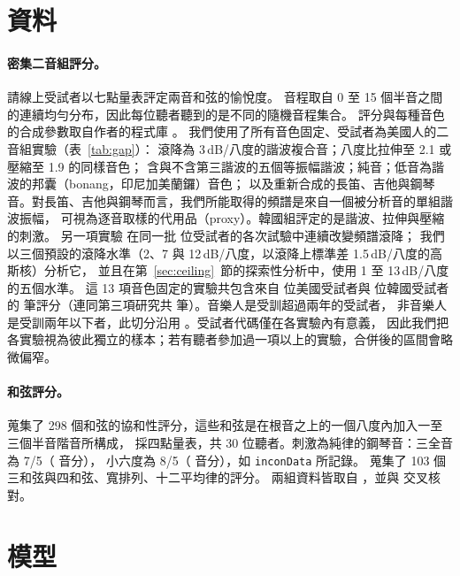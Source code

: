 \documentclass[11pt,a4paper]{article}
\begin{document}
\section{資料}

\paragraph{密集二音組評分。}
\citet{marjieh2024} 請線上受試者以七點量表評定兩音和弦的愉悅度。
音程取自 0 至 15 個半音之間的連續均勻分布，因此每位聽者聽到的是不同的隨機音程集合。
評分與每種音色的合成參數取自作者的程式庫 \citep{marjieh2024code}。
我們使用了所有音色固定、受試者為美國人的二音組實驗（表~\ref{tab:gap}）：
滾降為 3\,dB/八度的諧波複合音；八度比拉伸至 2.1 或壓縮至 1.9 的同樣音色；
含與不含第三諧波的五個等振幅諧波；純音；低音為諧波的邦囊（bonang，印尼加美蘭鑼）音色；
以及重新合成的長笛、吉他與鋼琴音。對長笛、吉他與鋼琴而言，我們所能取得的頻譜是來自一個被分析音的單組諧波振幅，
可視為逐音取樣的代用品（proxy）。韓國組評定的是諧波、拉伸與壓縮的刺激。
另一項實驗 \citep[第三項研究，出自][]{marjieh2024} 在同一批 \nRoll{} 位受試者的各次試驗中連續改變頻譜滾降；
我們以三個預設的滾降水準（2、7 與 12\,dB/八度，以滾降上標準差 1.5\,dB/八度的高斯核）分析它，
並且在第~\ref{sec:ceiling}~節的探索性分析中，使用 1 至 13\,dB/八度的五個水準。
這 13 項音色固定的實驗共包含來自 \nUSListeners{} 位美國受試者與 \nKRListeners{} 位韓國受試者的
\nAllTrials{} 筆評分（連同第三項研究共 \nTrialsTotal{} 筆）。音樂人是受訓超過兩年的受試者，
非音樂人是受訓兩年以下者，此切分沿用 \citet{marjieh2024}。受試者代碼僅在各實驗內有意義，
因此我們把各實驗視為彼此獨立的樣本；若有聽者參加過一項以上的實驗，合併後的區間會略微偏窄。

\paragraph{和弦評分。}
\citet{bowling2018} 蒐集了 298 個和弦的協和性評分，這些和弦是在根音之上的一個八度內加入一至三個半音階音所構成，
採四點量表，共 30 位聽者。刺激為純律的鋼琴音：三全音為 7/5（\jiCentsTT{} 音分），
小六度為 8/5（\jiCentsMsix{} 音分），如 \texttt{inconData} \citep{incondata} 所記錄。
\citet{johnsonlaird2012} 蒐集了 103 個三和弦與四和弦、寬排列、十二平均律的評分。
兩組資料皆取自 \citet{dcmlab}，並與 \citet{incondata} 交叉核對。

\section{模型}
\label{sec:models}
\end{document}
